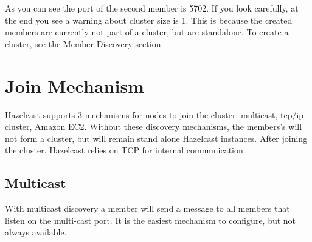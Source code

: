 As you can see the port of the second member is 5702. If you look carefully, at the end you see a warning about cluster size is 1. This is because the created members are currently not part of a cluster, but are standalone. To create a cluster, see the Member Discovery section.

\section{Join Mechanism }
Hazelcast supports 3 mechanisms for nodes to join the cluster: multicast, tcp/ip-cluster, Amazon EC2. Without these discovery mechanisms, the members's will not form a cluster, but will remain stand alone Hazelcast instances. After joining the cluster, Hazelcast relies on TCP for internal communication.

\subsection{Multicast}
With multicast discovery a member will send a message to all members that listen on the multi-cast port. It is the easiest mechanism to configure, but not always available. 

